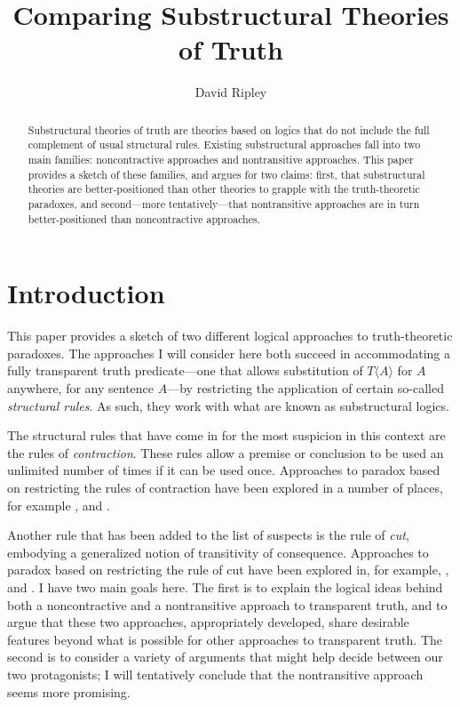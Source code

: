 \documentclass{ergoclass}
\title{Comparing Substructural \titlelinebreak Theories of Truth}
\author{David Ripley}
\affiliation{University of Connecticut}
\newcommand{\Tname}[1]{\T\name{#1}}
\newcommand{\name}[1]{\ensuremath{\langle #1 \rangle}}
\newcommand{\T}{\ensuremath{T}}
\renewcommand{\cite}{\citet}						%
\begin{document}
\maketitle

\begin{abstract}
Substructural theories of truth are theories based on logics that do not include the full
complement of usual structural rules. Existing substructural approaches fall into two
main families: noncontractive approaches and nontransitive approaches. This paper
provides a sketch of these families, and argues for two claims: first, that substructural
theories are better-positioned
than other theories to grapple with the truth-theoretic
paradoxes, and second---more
tentatively---that
nontransitive approaches are in turn
better-positioned
than noncontractive approaches.
\end{abstract}

\section{Introduction}

This paper provides a sketch of two different logical approaches to truth-theoretic paradoxes. The approaches I will consider here both succeed in accommodating a fully transparent truth predicate---one that allows substitution of $\Tname{A}$ for $A$ anywhere, for any sentence $A$---by restricting the application of certain so-called {\em structural rules}. As such, they work with what are known as substructural logics.

The structural rules that have come in for the most suspicion in this context are the rules of {\em contraction}. These rules allow a premise or conclusion to be used an unlimited number of times if it can be used once. Approaches to paradox based on restricting the rules of contraction have been explored in a number of places, for example \cite{bm:2curry, grishin:pstclwc, petersen:lwciua, restall:lwc, shapiro:dlc}, and \cite{zardini:twc}.

Another rule that has been added to the list of suspects is the rule of {\em cut}, embodying a generalized notion of transitivity of consequence. Approaches to paradox based on restricting the rule of cut have been explored in, for example, \citet*{cervr:rtt, ripley:pafc}, and \cite{weir:ntsl}. I have two main goals here. The first is to explain the logical ideas behind both a noncontractive and a nontransitive approach to transparent truth, and to argue that these two approaches, appropriately developed, share desirable features beyond what is possible for other approaches to transparent truth. The second is to consider a variety of arguments that might help decide between our two protagonists; I will tentatively conclude that the nontransitive approach seems more promising.
\end{document}
